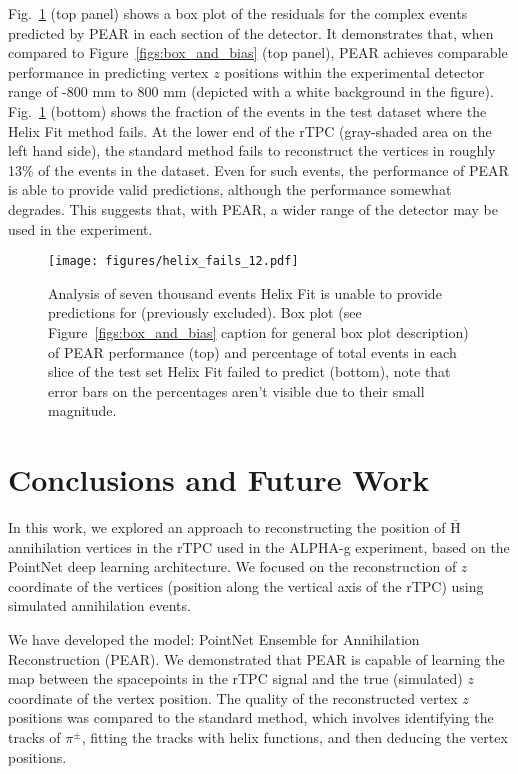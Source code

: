 \documentclass[a4paper,11pt]{article}
\begin{document}
Fig.~\ref{fig:failed_samples} (top panel) shows a box plot of the residuals for the complex events predicted by PEAR in each section of the detector. It demonstrates that, when compared to Figure~\ref{figs:box_and_bias} (top panel), PEAR achieves comparable performance in predicting vertex $z$ positions within the experimental detector range of -800 mm to 800 mm (depicted with a white background in the figure).  Fig.~\ref{fig:failed_samples} (bottom) shows the fraction of the events in the test dataset where the Helix Fit method fails. At the lower end of the rTPC (gray-shaded area on the left hand side), the standard method fails to reconstruct the vertices in roughly 13\% of the events in the dataset. Even for such events, the performance of PEAR is able to provide valid predictions, although the performance somewhat degrades. This suggests that, with PEAR, a wider range of the detector may be used in the experiment.

\begin{figure}[htbp]
    \centering
    \texttt{[image: figures/helix\_fails\_12.pdf]}
    \caption{\label{fig:failed_samples} Analysis of seven thousand events Helix Fit is unable to provide predictions for (previously excluded). Box plot (see Figure~\ref{figs:box_and_bias} caption for general box plot description) of PEAR performance (top) and percentage of total events in each slice of the test set Helix Fit failed to predict (bottom), note that error bars on the percentages aren't visible due to their small magnitude.}
\end{figure}


\section{\label{sec:conclusion}Conclusions and Future Work}
In this work, we explored an approach to reconstructing the position of $\overline{\mathrm{H}}$ annihilation vertices in the rTPC used in the ALPHA-g experiment, based on the PointNet deep learning architecture. We focused on the reconstruction of $z$ coordinate of the vertices (position along the vertical axis of the rTPC) using simulated annihilation events. 

We have developed the model: PointNet Ensemble for Annihilation Reconstruction (PEAR). We demonstrated that PEAR is capable of learning the map between the spacepoints in the rTPC signal and the true (simulated) $z$ coordinate of the vertex position. The quality of the reconstructed vertex $z$ positions was compared to the standard method, which involves identifying the tracks of $\pi^\pm$, fitting the tracks with helix functions, and then deducing the vertex positions.
\end{document}
